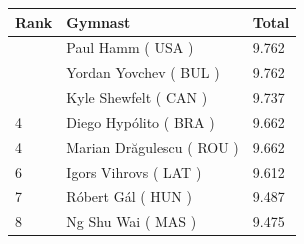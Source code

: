 \documentclass{article}
\begin{document}
\begin{tabular}{lll}
\toprule
Rank & Gymnast & Total \\
\midrule
 & Paul Hamm ( USA ) & 9.762 \\
 & Yordan Yovchev ( BUL ) & 9.762 \\
 & Kyle Shewfelt ( CAN ) & 9.737 \\
4 & Diego Hypólito ( BRA ) & 9.662 \\
4 & Marian Drăgulescu ( ROU ) & 9.662 \\
6 & Igors Vihrovs ( LAT ) & 9.612 \\
7 & Róbert Gál ( HUN ) & 9.487 \\
8 & Ng Shu Wai ( MAS ) & 9.475 \\
\bottomrule
\end{tabular}
\end{document}
